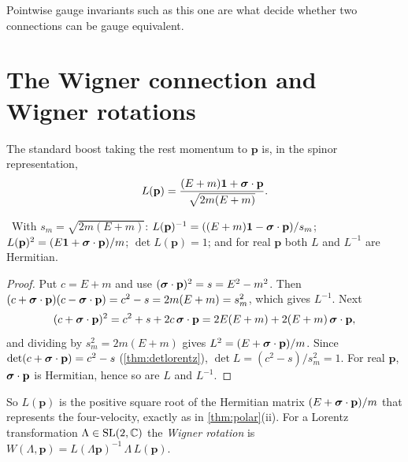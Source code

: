Pointwise gauge invariants such as this one are what decide whether two connections can be gauge equivalent.

\section{The Wigner connection and Wigner rotations}

The standard boost taking the rest momentum to $\mathbf p$ is, in the spinor representation,
\begin{equation}\label{eq:stdboost}
L(\mathbf p)=\frac{(E+m)\mathbf 1+\boldsymbol{\sigma}\cdot\mathbf p}{\sqrt{2m(E+m)}} .
\end{equation}

\begin{proposition}\label{prop:stdboost}\ver\
With $s_m=\sqrt{2m(E+m)}$: $L(\mathbf p)^{-1}=((E+m)\mathbf 1-\boldsymbol{\sigma}\cdot\mathbf p)/s_m$; $L(\mathbf p)^2=(E\mathbf 1+\boldsymbol{\sigma}\cdot\mathbf p)/m$; $\det L(\mathbf p)=1$; and for real $\mathbf p$ both $L$ and $L^{-1}$ are Hermitian.
\end{proposition}
\begin{proof}
Put $c=E+m$ and use $(\boldsymbol{\sigma}\cdot\mathbf p)^2=s=E^2-m^2$. Then $(c+\boldsymbol{\sigma}\cdot\mathbf p)(c-\boldsymbol{\sigma}\cdot\mathbf p)=c^2-s=2m(E+m)=s_m^2$, which gives $L^{-1}$. Next
\[
(c+\boldsymbol{\sigma}\cdot\mathbf p)^2=c^2+s+2c\,\boldsymbol{\sigma}\cdot\mathbf p=2E(E+m)+2(E+m)\,\boldsymbol{\sigma}\cdot\mathbf p,
\]
and dividing by $s_m^2=2m(E+m)$ gives $L^2=(E+\boldsymbol{\sigma}\cdot\mathbf p)/m$. Since $\det(c+\boldsymbol{\sigma}\cdot\mathbf p)=c^2-s$ (\cref{thm:detlorentz}), $\det L=(c^2-s)/s_m^2=1$. For real $\mathbf p$, $\boldsymbol{\sigma}\cdot\mathbf p$ is Hermitian, hence so are $L$ and $L^{-1}$.
\end{proof}


So $L(\mathbf p)$ is the positive square root of the Hermitian matrix $(E+\boldsymbol{\sigma}\cdot\mathbf p)/m$ that represents the four-velocity, exactly as in \cref{thm:polar}(ii). For a Lorentz transformation $\Lambda\in\mathrm{SL}(2,\mathbb{C})$ the \emph{Wigner rotation} is $W(\Lambda,\mathbf p)=L(\Lambda\mathbf p)^{-1}\,\Lambda\,L(\mathbf p)$.

